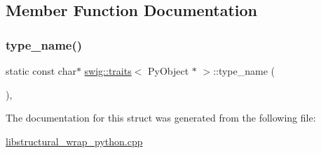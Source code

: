 \subsection{Member Function Documentation}
\mbox{\label{structswig_1_1traits_3_01_py_object_01_5_01_4_a0d02bab40318920cce95270a10e465cd}} 
\subsubsection{\texorpdfstring{type\+\_\+name()}{type\_name()}}
{\footnotesize\ttfamily static const char$\ast$ \hyperlink{structswig_1_1traits}{swig\+::traits}$<$ Py\+Object $\ast$ $>$\+::type\+\_\+name (\begin{DoxyParamCaption}{ }\end{DoxyParamCaption})\hspace{0.3cm}{\ttfamily [inline]}, {\ttfamily [static]}}



The documentation for this struct was generated from the following file\+:\begin{DoxyCompactItemize}
\item 
\hyperlink{libstructural__wrap__python_8cpp}{libstructural\+\_\+wrap\+\_\+python.\+cpp}\end{DoxyCompactItemize}
